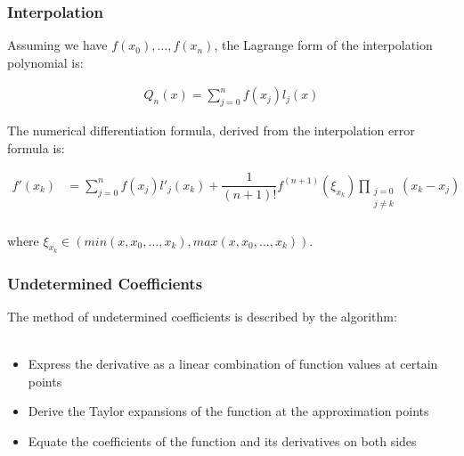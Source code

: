 \documentclass{beamer}
\begin{document}
\begin{frame}
\frametitle{Interpolation}

Assuming we have $f(x_0),\ldots, f(x_n)$, the Lagrange form of the interpolation polynomial is:

\begin{align*}
Q_n(x) = \sum_{j=0}^n f(x_j) l_j(x)
\end{align*}

The numerical differentiation formula, derived from the interpolation error formula is:

\begin{align*}
f'\left( x_{k}\right) &=\sum _{j=0}^{n}f\left( x_{j}\right) l'_{j}\left( x_{k}\right)+\dfrac {1} {\left( n+1\right) !}f^{\left( n+1\right) }\left( \xi _{x_{k}}\right)  \prod _{\substack{j=0\\j\neq k}}\left( x_{k}-x_{j}\right) \\
\end{align*}

where $\xi_{x_k}\in  (min(x, x_0, . . . , x_k), max(x, x_0, . . . , x_k)). $
\end{frame}

\begin{frame}
\frametitle{Undetermined Coefficients}

The method of undetermined coefficients is described by the algorithm:\\
\hfill\\

\begin{itemize}
\setlength\itemsep{1em}
\item Express the derivative as a linear combination of function values at certain points
\item Derive the Taylor expansions of the function at the approximation points
\item Equate the coefficients of the function and its derivatives on both sides
\end{itemize}

\end{frame}
\end{document}
